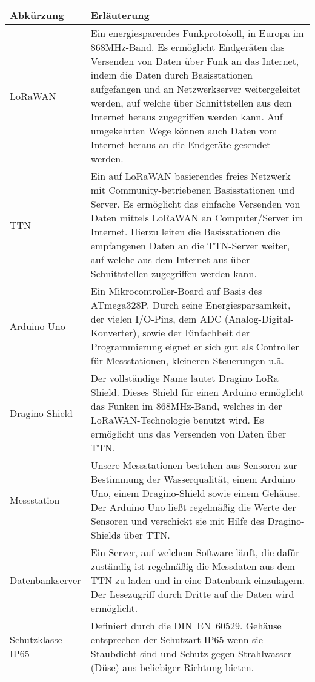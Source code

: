 \documentclass[
11pt,
a4paper,
ngerman,
]{article}
\begin{document}
\begin{table}[H]
	\begin{tabularx}{\textwidth}{ |l|X| }
		\hline  %
		\rowcolor[gray]{.8}%
		\rule{0pt}{18pt}%
		\textbf{Abkürzung} & \textbf{Erläuterung} \\
		\hline  %
		LoRaWAN & Ein energiesparendes Funkprotokoll, in Europa im 868MHz-Band. Es ermöglicht Endgeräten das Versenden von Daten über Funk an das Internet, indem die Daten durch Basisstationen aufgefangen und an Netzwerkserver weitergeleitet werden, auf welche über Schnittstellen aus dem Internet heraus zugegriffen werden kann. Auf umgekehrten Wege können auch Daten vom Internet heraus an die Endgeräte gesendet werden. \\
		\hline
		TTN & Ein auf LoRaWAN basierendes freies Netzwerk mit Community-betriebenen Basisstationen und Server. Es ermöglicht das einfache Versenden von Daten mittels LoRaWAN an Computer/Server im Internet. Hierzu leiten die Basisstationen die empfangenen Daten an die TTN-Server weiter, auf welche aus dem Internet aus über Schnittstellen zugegriffen werden kann. \\
		\hline
		Arduino Uno & Ein Mikrocontroller-Board auf Basis des ATmega328P. Durch seine Energiesparsamkeit, der vielen I/O-Pins, dem ADC (Analog-Digital-Konverter), sowie der Einfachheit der Programmierung eignet er sich gut als Controller für Messstationen, kleineren Steuerungen u.ä. \\
		\hline
		Dragino-Shield & Der vollständige Name lautet Dragino LoRa Shield. Dieses Shield für einen Arduino ermöglicht das Funken im 868MHz-Band, welches in der LoRaWAN-Technologie benutzt wird. Es ermöglicht uns das Versenden von Daten über TTN. \\
		\hline
		Messstation & Unsere Messstationen bestehen aus Sensoren zur Bestimmung der Wasserqualität, einem Arduino Uno, einem Dragino-Shield sowie einem Gehäuse. Der Arduino Uno ließt regelmäßig die Werte der Sensoren und verschickt sie mit Hilfe des Dragino-Shields über TTN. \\
		\hline
		Datenbankserver & Ein Server, auf welchem Software läuft, die dafür zuständig ist regelmäßig die Messdaten aus dem TTN zu laden und in eine Datenbank einzulagern. Der Lesezugriff durch Dritte auf die Daten wird ermöglicht. \\
		\hline
		Schutzklasse IP65 & Definiert durch die DIN~EN~60529. Gehäuse entsprechen der Schutzart IP65 wenn sie Staubdicht sind und Schutz gegen Strahlwasser (Düse) aus beliebiger Richtung bieten. \\

\end{tabularx}
\end{table}
\end{document}
